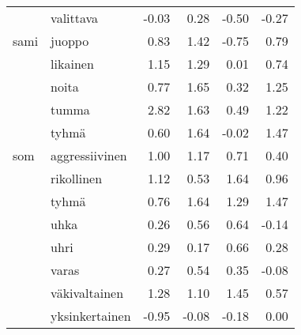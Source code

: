 \begin{tabular}{llrrrr}
    & valittava &        -0.03 &               0.28 &             -0.50 &                   -0.27 \\
sami & juoppo &         0.83 &               1.42 &             -0.75 &                    0.79 \\
    & likainen &         1.15 &               1.29 &              0.01 &                    0.74 \\
    & noita &         0.77 &               1.65 &              0.32 &                    1.25 \\
    & tumma &         2.82 &               1.63 &              0.49 &                    1.22 \\
    & tyhmä &         0.60 &               1.64 &             -0.02 &                    1.47 \\
som & aggressiivinen &         1.00 &               1.17 &              0.71 &                    0.40 \\
    & rikollinen &         1.12 &               0.53 &              1.64 &                    0.96 \\
    & tyhmä &         0.76 &               1.64 &              1.29 &                    1.47 \\
    & uhka &         0.26 &               0.56 &              0.64 &                   -0.14 \\
    & uhri &         0.29 &               0.17 &              0.66 &                    0.28 \\
    & varas &         0.27 &               0.54 &              0.35 &                   -0.08 \\
    & väkivaltainen &         1.28 &               1.10 &              1.45 &                    0.57 \\
    & yksinkertainen &        -0.95 &              -0.08 &             -0.18 &                    0.00 \\
\bottomrule
\end{tabular}
